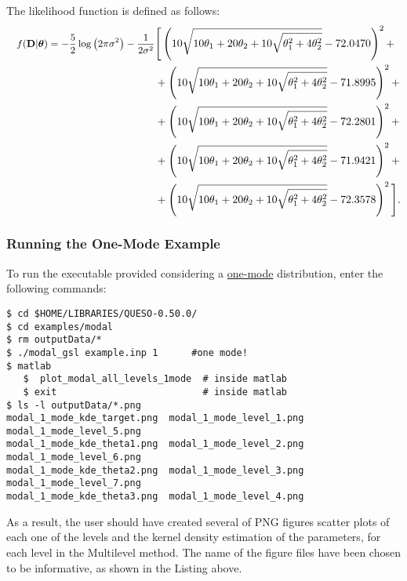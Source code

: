 The likelihood function is defined as follows:
\begin{equation}
\begin{split} \small
\quad f({\bf D}|\mbox{\boldmath$ \theta $})= -\dfrac{5}{2} \log\left(2 \pi \sigma^2\right)-\dfrac{1}{2\sigma^2} &\Bigg[
 \left(10 \sqrt{10 \theta_1+20 \theta_2+10 \sqrt{\theta_1^2+4 \theta_2^2}}-72.0470\right)^2 +\\
&+\left(10 \sqrt{10 \theta_1+20 \theta_2+10 \sqrt{\theta_1^2+4 \theta_2^2}}-71.8995\right)^2 +\\
&+\left(10 \sqrt{10 \theta_1+20 \theta_2+10 \sqrt{\theta_1^2+4 \theta_2^2}}-72.2801\right)^2 +\\
&+\left(10 \sqrt{10 \theta_1+20 \theta_2+10 \sqrt{\theta_1^2+4 \theta_2^2}}-71.9421\right)^2 +\\
&+\left(10 \sqrt{10 \theta_1+20 \theta_2+10 \sqrt{\theta_1^2+4 \theta_2^2}}-72.3578\right)^2 \Bigg].
\end{split}
\end{equation}

\subsubsection{Running the One-Mode Example}
 
To run the executable provided considering a \underline{one-mode} distribution, enter the following commands:
\begin{lstlisting}[label={},caption={Running the example with a one-mode distribution.}]
$ cd $HOME/LIBRARIES/QUESO-0.50.0/
$ cd examples/modal
$ rm outputData/*
$ ./modal_gsl example.inp 1      #one mode!
$ matlab
   $  plot_modal_all_levels_1mode  # inside matlab
   $ exit                          # inside matlab
$ ls -l outputData/*.png
modal_1_mode_kde_target.png  modal_1_mode_level_1.png  modal_1_mode_level_5.png
modal_1_mode_kde_theta1.png  modal_1_mode_level_2.png  modal_1_mode_level_6.png
modal_1_mode_kde_theta2.png  modal_1_mode_level_3.png  modal_1_mode_level_7.png
modal_1_mode_kde_theta3.png  modal_1_mode_level_4.png
\end{lstlisting}

As a result, the user should have created several of PNG figures scatter plots of each one of the levels and the kernel density estimation of the parameters, for each level in the Multilevel method. The name of the figure files have been chosen to be informative, as shown in the Listing above. 




